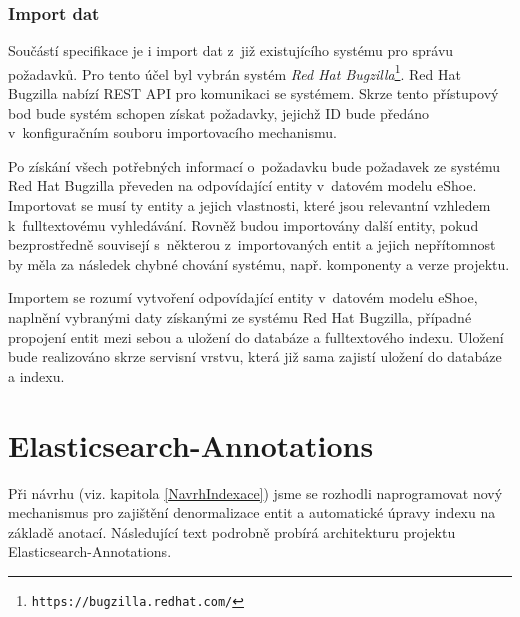 \documentclass[11pt,oneside]{fithesis2}
\begin{document}
\subsection{Import dat}
Součástí specifikace je i import dat z~již existujícího systému pro správu požadavků. Pro tento účel byl vybrán systém \emph{Red Hat Bugzilla}\footnote{\texttt{https://bugzilla.redhat.com/}}. Red Hat Bugzilla nabízí REST API pro komunikaci se systémem. Skrze tento přístupový bod bude systém schopen získat požadavky, jejichž ID bude předáno v~konfiguračním souboru importovacího mechanismu.

Po získání všech potřebných informací o~požadavku bude požadavek ze systému Red Hat Bugzilla převeden na odpovídající entity v~datovém modelu eShoe. Importovat se musí ty entity a jejich vlastnosti, které jsou relevantní vzhledem k~fulltextovému vyhledávání. Rovněž budou importovány další entity, pokud bezprostředně souvisejí s~některou z~importovaných entit a jejich nepřítomnost by měla za následek chybné chování systému, např. komponenty a verze projektu.

Importem se rozumí vytvoření odpovídající entity v~datovém modelu eShoe, naplnění vybranými daty získanými ze systému Red Hat Bugzilla, případné propojení entit mezi sebou a uložení do databáze a fulltextového indexu. Uložení bude realizováno skrze servisní vrstvu, která již sama zajistí uložení do databáze a indexu. 

\chapter{Elasticsearch-Annotations}
\label{ElasticsearchAnnotationsChapter}
Při návrhu (viz. kapitola \ref{NavrhIndexace}) jsme se rozhodli naprogramovat nový mechanismus pro zajištění denormalizace entit a automatické úpravy indexu na základě anotací. Následující text podrobně probírá architekturu projektu Elasticsearch-Annotations. 

\end{document}
